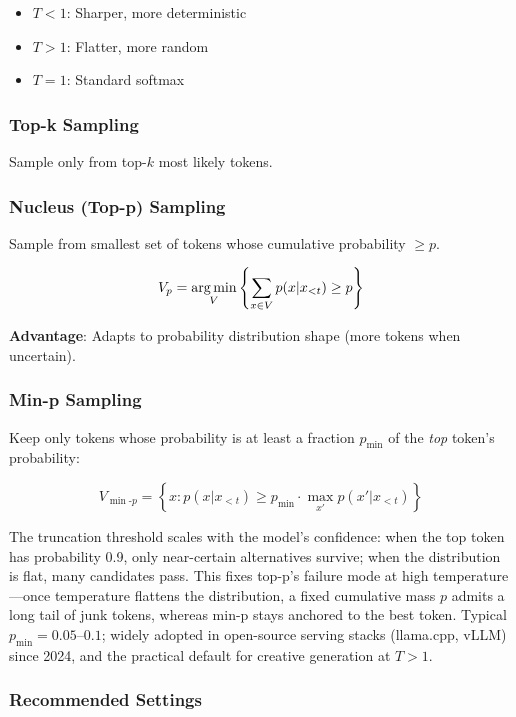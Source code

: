 \begin{itemize}
    \item $T < 1$: Sharper, more deterministic
    \item $T > 1$: Flatter, more random
    \item $T = 1$: Standard softmax
\end{itemize}

\subsubsection{Top-k Sampling}
Sample only from top-$k$ most likely tokens.

\subsubsection{Nucleus (Top-p) Sampling}
Sample from smallest set of tokens whose cumulative probability $\geq p$.

\begin{equation}
V_p = \operatorname*{arg\,min}_V \left\{\sum_{x \in V} p(x | x_{<t}) \geq p\right\}
\end{equation}

\textbf{Advantage}: Adapts to probability distribution shape (more tokens when uncertain).

\subsubsection{Min-p Sampling}
Keep only tokens whose probability is at least a fraction $p_{\min}$ of the \emph{top} token's probability:

\begin{equation}
V_{\min\text{-}p} = \left\{x : p(x | x_{<t}) \geq p_{\min} \cdot \max_{x'} p(x' | x_{<t})\right\}
\end{equation}

The truncation threshold scales with the model's confidence: when the top token has probability 0.9, only near-certain alternatives survive; when the distribution is flat, many candidates pass. This fixes top-p's failure mode at high temperature---once temperature flattens the distribution, a fixed cumulative mass $p$ admits a long tail of junk tokens, whereas min-p stays anchored to the best token. Typical $p_{\min} = 0.05$--$0.1$; widely adopted in open-source serving stacks (llama.cpp, vLLM) since 2024, and the practical default for creative generation at $T > 1$.

\subsubsection{Recommended Settings}

